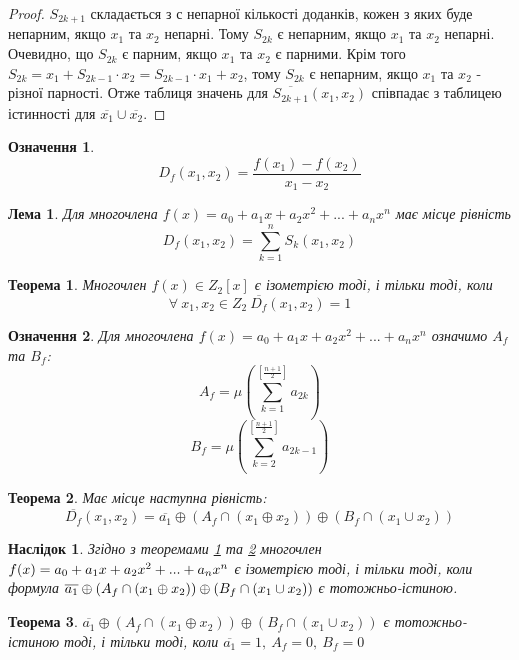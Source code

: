 \documentclass[a4paper,12pt]{article} \usepackage{a4wide}
\newcommand*{\hm}[1]{#1\nobreak\discretionary{}%
  {\hbox{$\mathsurround=0pt #1$}}{}} \newcommand{\bb}[1]{{\bf #1}}
\numberwithin{equation}{subsection}
\newtheorem{theorem}{Теорема}[subsection]
\newtheorem{lemma}{Лема}[subsection]
\newtheorem{corollary}{Наслідок}[subsection]
\newtheorem{definition}{Означення}[subsection]
\begin{document}
 \begin{proof}
   $S_{2k+1}$ складається з с непарної кількості доданків, кожен з
   яких буде непарним, якщо $x_1$ та $x_2$ непарні. Тому $S_{2k}$ є
   непарним, якщо $x_1$ та $x_2$ непарні. Очевидно, що $S_{2k}$ є
   парним, якщо $x_1$ та $x_2$ є парними. Крім того
   $S_{2k}=x_1+S_{2k-1}\cdot x_2=S_{2k-1}\cdot x_1+x_2$, тому $S_{2k}$
   є непарним, якщо $x_1$ та $x_2$ - різної парності. Отже таблиця
   значень для $\overline{S_{2k+1}}(x_1,x_2)$ співпадає з таблицею
   істинності для $\overline{x_1}\cup \overline{x_2}$.
 \end{proof}
 \begin{definition}
 $$D_f(x_1,x_2)=\frac{f(x_1)-f(x_2)}{x_1-x_2}$$
\end{definition}
\begin{lemma}
  Для многочлена $f(x)=a_0+a_1x+a_2x^2+...+a_nx^n$ має місце
  рівність $$D_f(x_1,x_2)=\sum_{k=1}^n S_k(x_1,x_2)$$
\end{lemma}
\begin{theorem}\label{izomumov1}
  Многочлен $f(x)\in Z_2[x]$ є ізометрією тоді, і тільки тоді,
  коли $$\forall\ x_1,x_2 \in Z_2\ \overline{D_f}(x_1,x_2)=1$$
\end{theorem}
\begin{definition}
  Для многочлена $f(x)=a_0+a_1x+a_2x^2+...+a_nx^n$ означимо $A_f$ та
  $B_f$:
 $$ A_f=\mu \left(\sum_{k=1}^{[\frac{n+1}{2}]}a_{2k}\right)$$
 $$ B_f=\mu \left(\sum_{k=2}^{[\frac{n+1}{2}]}a_{2k-1}\right)$$
\end{definition}
\begin{theorem}\label{rivnist} Має місце наступна рівність:
 $$\overline{D_f}(x_1,x_2)=\overline{a_1}\oplus (A_f\cap (x_1\oplus x_2))\oplus (B_f\cap (x_1\cup x_2))$$
\end{theorem}
\begin{corollary}\label{naslidok1} Згідно з теоремами \ref{izomumov1}
  та \ref{rivnist} многочлен
  $f(x)=a_0\hm+a_1x\hm+a_2x^2\hm+...\hm+a_nx^n$ є ізометрією тоді, і
  тільки тоді, коли формула $\overline{a_1}\hm\oplus (A_f\hm\cap
  (x_1\hm\oplus x_2)\hm)\oplus (B_f\hm\cap (x_1\hm\cup x_2))$ є
  тотожньо-істиною.
\end{corollary}
\begin{theorem}\label{istformul} $\overline{a_1}\oplus (A_f\cap
  (x_1\oplus x_2))\oplus (B_f\cap (x_1\cup x_2))$ є тотожньо-істиною
  тоді, і тільки тоді, коли $\overline{a_1}=1,\ A_f=0,\ B_f=0$
\end{theorem}
\end{document}
